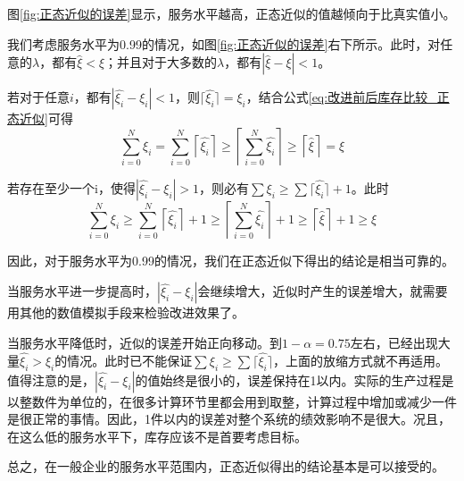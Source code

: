 图\ref{fig:正态近似的误差}显示，服务水平越高，正态近似的值越倾向于比真实值小。

我们考虑服务水平为0.99的情况，如图\ref{fig:正态近似的误差}右下所示。此时，对任意的$\lambda$，都有$\hat{\xi} < \xi$；并且对于大多数的$\lambda$，都有$|\hat{\xi} - \xi| < 1$。

若对于任意$i$，都有$|\hat{\xi_i}-\xi_i| < 1$，则$\lceil\hat{\xi_i}\rceil=\xi_i$，结合公式\ref{eq:改进前后库存比较_正态近似}可得
\begin{equation}
\sum_{i=0}^N \xi_i = \sum_{i=0}^N \left\lceil\hat{\xi_i}\right\rceil \geq \left\lceil\sum_{i=0}^N\hat{\xi_i}\right\rceil \geq \left\lceil\hat{\xi}\right\rceil = \xi
\end{equation}

若存在至少一个i，使得$|\hat{\xi_i}-\xi_i| > 1$，则必有$\sum\xi_i \geq \sum\lceil\hat{\xi_i}\rceil + 1$。此时
\begin{equation}
\sum_{i=0}^N \xi_i \geq \sum_{i=0}^N\left\lceil\hat{\xi_i}\right\rceil + 1 \geq \left\lceil\sum_{i=0}^N\hat{\xi_i}\right\rceil + 1 \geq \left\lceil\hat{\xi}\right\rceil + 1 \geq \xi
\end{equation}

因此，对于服务水平为0.99的情况，我们在正态近似下得出的结论是相当可靠的。

当服务水平进一步提高时，$|\hat{\xi_i}-\xi_i|$会继续增大，近似时产生的误差增大，就需要用其他的数值模拟手段来检验改进效果了。

当服务水平降低时，近似的误差开始正向移动。到$1-\alpha=0.75$左右，已经出现大量$\hat{\xi_i} > \xi_i$的情况。此时已不能保证$\sum\xi_i \geq \sum\lceil\hat{\xi_i}\rceil$，上面的放缩方式就不再适用。值得注意的是，$|\hat{\xi_i}-\xi_i|$的值始终是很小的，误差保持在1以内。实际的生产过程是以整数件为单位的，在很多计算环节里都会用到取整，计算过程中增加或减少一件是很正常的事情。因此，1件以内的误差对整个系统的绩效影响不是很大。况且，在这么低的服务水平下，库存应该不是首要考虑目标。

总之，在一般企业的服务水平范围内，正态近似得出的结论基本是可以接受的。






